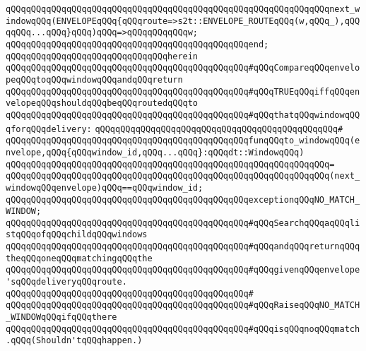 \verb|qQQqqQQqqQQqqQQqqQQqqQQqqQQqqQQqqQQqqQQqqQQqqQQqqQQqqQQqqQQqqQQqnext_windowqQQq(ENVELOPEqQQq{qQQqroute=>s2t::ENVELOPE_ROUTEqQQq(w,qQQq_),qQQqqQQq...qQQq}qQQq)qQQq=>qQQqqQQqqQQqw;|\newline
\verb|qQQqqQQqqQQqqQQqqQQqqQQqqQQqqQQqqQQqqQQqqQQqqQQqend;|\newline
\newline
\verb|qQQqqQQqqQQqqQQqqQQqqQQqqQQqqQQqherein|\newline
\newline
\verb|qQQqqQQqqQQqqQQqqQQqqQQqqQQqqQQqqQQqqQQqqQQqqQQq#qQQqCompareqQQqenvelopeqQQqtoqQQqwindowqQQqandqQQqreturn|\newline
\verb|qQQqqQQqqQQqqQQqqQQqqQQqqQQqqQQqqQQqqQQqqQQqqQQq#qQQqTRUEqQQqiffqQQqenvelopeqQQqshouldqQQqbeqQQqroutedqQQqto|\newline
\verb|qQQqqQQqqQQqqQQqqQQqqQQqqQQqqQQqqQQqqQQqqQQqqQQq#qQQqthatqQQqwindowqQQqforqQQqdelivery:|\newline
\verb|qQQqqQQqqQQqqQQqqQQqqQQqqQQqqQQqqQQqqQQqqQQqqQQq#|\newline
\verb|qQQqqQQqqQQqqQQqqQQqqQQqqQQqqQQqqQQqqQQqqQQqqQQqfunqQQqto_windowqQQq(envelope,qQQq{qQQqwindow_id,qQQq...qQQq}:qQQqdt::WindowqQQq)|\newline
\verb|qQQqqQQqqQQqqQQqqQQqqQQqqQQqqQQqqQQqqQQqqQQqqQQqqQQqqQQqqQQqqQQq=|\newline
\verb|qQQqqQQqqQQqqQQqqQQqqQQqqQQqqQQqqQQqqQQqqQQqqQQqqQQqqQQqqQQqqQQq(next_windowqQQqenvelope)qQQq==qQQqwindow_id;|\newline
\newline
\verb|qQQqqQQqqQQqqQQqqQQqqQQqqQQqqQQqqQQqqQQqqQQqqQQqexceptionqQQqNO_MATCH_WINDOW;|\newline
\newline
\verb|qQQqqQQqqQQqqQQqqQQqqQQqqQQqqQQqqQQqqQQqqQQqqQQq#qQQqSearchqQQqaqQQqlistqQQqofqQQqchildqQQqwindows|\newline
\verb|qQQqqQQqqQQqqQQqqQQqqQQqqQQqqQQqqQQqqQQqqQQqqQQq#qQQqandqQQqreturnqQQqtheqQQqoneqQQqmatchingqQQqthe|\newline
\verb|qQQqqQQqqQQqqQQqqQQqqQQqqQQqqQQqqQQqqQQqqQQqqQQq#qQQqgivenqQQqenvelope'sqQQqdeliveryqQQqroute.|\newline
\verb|qQQqqQQqqQQqqQQqqQQqqQQqqQQqqQQqqQQqqQQqqQQqqQQq#|\newline
\verb|qQQqqQQqqQQqqQQqqQQqqQQqqQQqqQQqqQQqqQQqqQQqqQQq#qQQqRaiseqQQqNO_MATCH_WINDOWqQQqifqQQqthere|\newline
\verb|qQQqqQQqqQQqqQQqqQQqqQQqqQQqqQQqqQQqqQQqqQQqqQQq#qQQqisqQQqnoqQQqmatch.qQQq(Shouldn'tqQQqhappen.)|\newline
